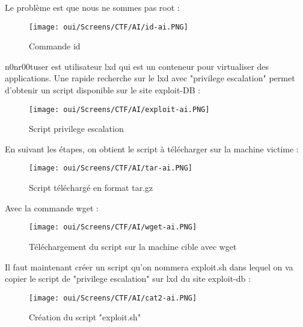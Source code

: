 \noindent Le problème est que nous ne sommes pas root :

\begin{figure}[htp!]
  \centering
  \setlength\figureheight{7cm}
  \setlength\figurewidth{9cm}
  \texttt{[image: oui/Screens/CTF/AI/id-ai.PNG]}   
  \caption{Commande id}
  \label{fig:courbe-tikz}
\end{figure}

\noindent n0nr00tuser est utilisateur lxd qui est un conteneur pour virtualiser des applications.  Une rapide recherche sur le lxd avec "privilege escalation" permet d'obtenir un script disponible sur le site exploit-DB :

\begin{figure}[htp!]
  \centering
  \setlength\figureheight{7cm}
  \setlength\figurewidth{9cm}
  \texttt{[image: oui/Screens/CTF/AI/exploit-ai.PNG]}   
  \caption{Script privilege escalation}
  \label{fig:courbe-tikz}
\end{figure}

\newpage
\noindent En suivant les étapes, on obtient le script à télécharger sur la machine victime :

\begin{figure}[htp!]
  \centering
  \setlength\figureheight{7cm}
  \setlength\figurewidth{9cm}
  \texttt{[image: oui/Screens/CTF/AI/tar-ai.PNG]}   
  \caption{Script téléchargé en format tar.gz}
  \label{fig:courbe-tikz}
\end{figure}

\noindent Avec la commande wget :

\begin{figure}[htp!]
  \centering
  \setlength\figureheight{7cm}
  \setlength\figurewidth{9cm}
  \texttt{[image: oui/Screens/CTF/AI/wget-ai.PNG]}      
  \caption{Téléchargement du script sur la machine cible avec wget}
  \label{fig:courbe-tikz}
\end{figure}

\noindent Il faut maintenant créer un script qu'on nommera exploit.sh dans lequel on va copier le script de "privilege escalation" sur lxd du site exploit-db :

\begin{figure}[htp!]
  \centering
  \setlength\figureheight{7cm}
  \setlength\figurewidth{9cm}
  \texttt{[image: oui/Screens/CTF/AI/cat2-ai.PNG]}      
  \caption{Création du script "exploit.sh"}
  \label{fig:courbe-tikz}
\end{figure}

